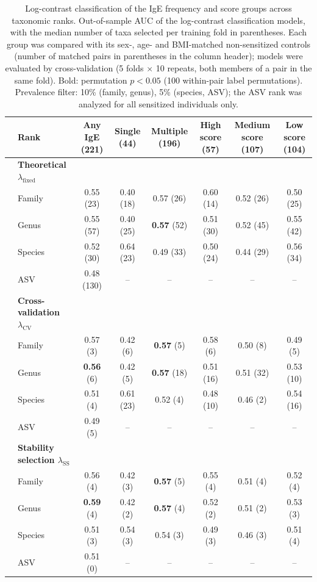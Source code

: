 \begin{table}
\small
\centering
\begin{tabular}{l l c c c c c c }
 & \textbf{Rank} & \textbf{Any IgE} (221) & \textbf{Single} (44) & \textbf{Multiple} (196) & \textbf{High score} (57) & \textbf{Medium score} (107) & \textbf{Low score} (104) \\
\hline
 & \textbf{Theoretical $\lambda_{\text{fixed}}$} & & & & & & \\
& Family & 0.55 (23) & 0.40 (18) & 0.57 (26) & 0.60 (14) & 0.52 (26) & 0.50 (25) \\
& Genus & 0.55 (57) & 0.40 (25) & \textbf{0.57} (52) & 0.51 (30) & 0.52 (45) & 0.55 (42) \\
& Species & 0.52 (30) & 0.64 (23) & 0.49 (33) & 0.50 (24) & 0.44 (29) & 0.56 (34) \\
& ASV & 0.48 (130) & -- & -- & -- & -- & -- \\
\hline
 & \textbf{Cross-validation $\lambda_{\text{CV}}$} & & & & & & \\
& Family & 0.57 (3) & 0.42 (6) & \textbf{0.57} (5) & 0.58 (6) & 0.50 (8) & 0.49 (5) \\
& Genus & \textbf{0.56} (6) & 0.42 (5) & \textbf{0.57} (18) & 0.51 (16) & 0.51 (32) & 0.53 (10) \\
& Species & 0.51 (4) & 0.61 (23) & 0.52 (4) & 0.48 (10) & 0.46 (2) & 0.54 (16) \\
& ASV & 0.49 (5) & -- & -- & -- & -- & -- \\
\hline
 & \textbf{Stability selection $\lambda_{\text{SS}}$} & & & & & & \\
& Family & 0.56 (4) & 0.42 (3) & \textbf{0.57} (5) & 0.55 (4) & 0.51 (4) & 0.52 (4) \\
& Genus & \textbf{0.59} (4) & 0.42 (2) & \textbf{0.57} (4) & 0.52 (2) & 0.51 (2) & 0.53 (3) \\
& Species & 0.51 (3) & 0.54 (3) & 0.54 (3) & 0.49 (3) & 0.46 (3) & 0.51 (4) \\
& ASV & 0.51 (0) & -- & -- & -- & -- & -- \\
\hline
\end{tabular}
\caption{Log-contrast classification of the IgE frequency and score groups across taxonomic ranks. Out-of-sample AUC of the log-contrast classification models, with the median number of taxa selected per training fold in parentheses. Each group was compared with its sex-, age- and BMI-matched non-sensitized controls (number of matched pairs in parentheses in the column header); models were evaluated by cross-validation (5 folds $\times$ 10 repeats, both members of a pair in the same fold). Bold: permutation $p<0.05$ (100 within-pair label permutations). Prevalence filter: 10\% (family, genus), 5\% (species, ASV); the ASV rank was analyzed for all sensitized individuals only.\label{tab:classo_auc_burden}}
\end{table}
